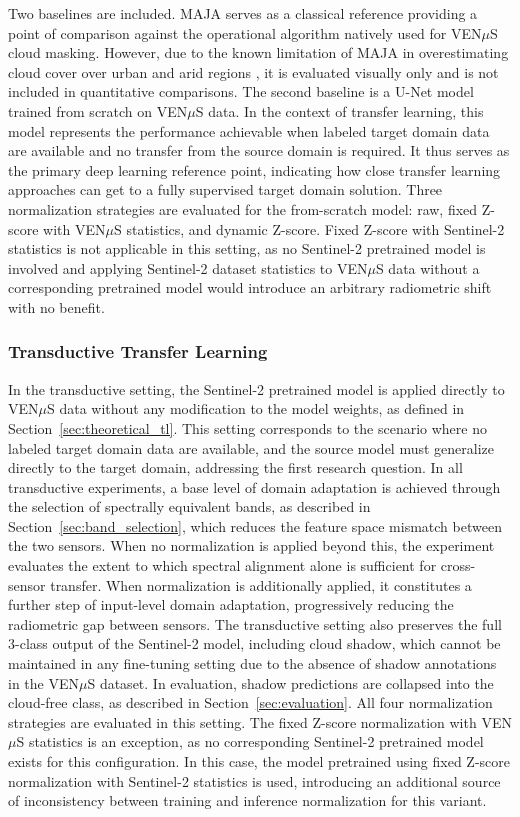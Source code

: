 Two baselines are included. MAJA \cite{hagolle2010} serves as a classical reference providing a point of comparison against the operational algorithm natively used for VEN$\mu$S cloud masking. However, due to the known limitation of MAJA in overestimating cloud cover over urban and arid regions \cite{pesek2022}, it is evaluated visually only and is not included in quantitative comparisons. The second baseline is a U-Net model trained from scratch on VEN$\mu$S data. In the context of transfer learning, this model represents the performance achievable when labeled target domain data are available and no transfer from the source domain is required. It thus serves as the primary deep learning reference point, indicating how close transfer learning approaches can get to a fully supervised target domain solution. Three normalization strategies are evaluated for the from-scratch model: raw, fixed Z-score with VEN$\mu$S statistics, and dynamic Z-score. Fixed Z-score with Sentinel-2 statistics is not applicable in this setting, as no Sentinel-2 pretrained model is involved and applying Sentinel-2 dataset statistics to VEN$\mu$S data without a corresponding pretrained model would introduce an arbitrary radiometric shift with no benefit.

\subsubsection{Transductive Transfer Learning}

In the transductive setting, the Sentinel-2 pretrained model is applied directly to VEN$\mu$S data without any modification to the model weights, as defined in Section~\ref{sec:theoretical_tl}. This setting corresponds to the scenario where no labeled target domain data are available, and the source model must generalize directly to the target domain, addressing the first research question. In all transductive experiments, a base level of domain adaptation is achieved through the selection of spectrally equivalent bands, as described in Section~\ref{sec:band_selection}, which reduces the feature space mismatch between the two sensors. When no normalization is applied beyond this, the experiment evaluates the extent to which spectral alignment alone is sufficient for cross-sensor transfer. When normalization is additionally applied, it constitutes a further step of input-level domain adaptation, progressively reducing the radiometric gap between sensors. The transductive setting also preserves the full 3-class output of the Sentinel-2 model, including cloud shadow, which cannot be maintained in any fine-tuning setting due to the absence of shadow annotations in the VEN$\mu$S dataset. In evaluation, shadow predictions are collapsed into the cloud-free class, as described in Section~\ref{sec:evaluation}. All four normalization strategies are evaluated in this setting. The fixed Z-score normalization with VEN$\mu$S statistics is an exception, as no corresponding Sentinel-2 pretrained model exists for this configuration. In this case, the model pretrained using fixed Z-score normalization with Sentinel-2 statistics is used, introducing an additional source of inconsistency between training and inference normalization for this variant.

